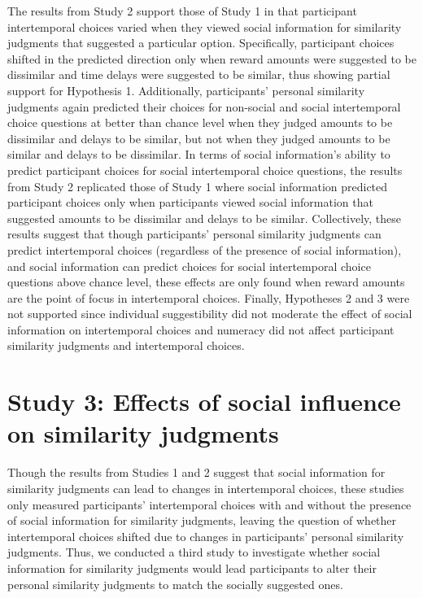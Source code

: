 \documentclass[
  pub,floatsintext]{apa6}
\begin{document}
The results from Study 2 support those of Study 1 in that participant intertemporal choices varied when they viewed social information for similarity judgments that suggested a particular option. Specifically, participant choices shifted in the predicted direction only when reward amounts were suggested to be dissimilar and time delays were suggested to be similar, thus showing partial support for Hypothesis 1. Additionally, participants' personal similarity judgments again predicted their choices for non-social and social intertemporal choice questions at better than chance level when they judged amounts to be dissimilar and delays to be similar, but not when they judged amounts to be similar and delays to be dissimilar. In terms of social information's ability to predict participant choices for social intertemporal choice questions, the results from Study 2 replicated those of Study 1 where social information predicted participant choices only when participants viewed social information that suggested amounts to be dissimilar and delays to be similar. Collectively, these results suggest that though participants' personal similarity judgments can predict intertemporal choices (regardless of the presence of social information), and social information can predict choices for social intertemporal choice questions above chance level, these effects are only found when reward amounts are the point of focus in intertemporal choices. Finally, Hypotheses 2 and 3 were not supported since individual suggestibility did not moderate the effect of social information on intertemporal choices and numeracy did not affect participant similarity judgments and intertemporal choices.

\hypertarget{study-3-effects-of-social-influence-on-similarity-judgments}{%
\section{Study 3: Effects of social influence on similarity judgments}\label{study-3-effects-of-social-influence-on-similarity-judgments}}

Though the results from Studies 1 and 2 suggest that social information for similarity judgments can lead to changes in intertemporal choices, these studies only measured participants' intertemporal choices with and without the presence of social information for similarity judgments, leaving the question of whether intertemporal choices shifted due to changes in participants' personal similarity judgments. Thus, we conducted a third study to investigate whether social information for similarity judgments would lead participants to alter their personal similarity judgments to match the socially suggested ones.
\end{document}

